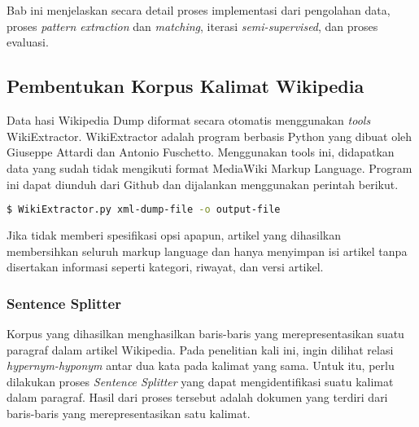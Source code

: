 \chapter{\babEmpat}
Bab ini menjelaskan secara detail proses implementasi dari pengolahan data, proses \textit{pattern extraction} dan \textit{matching}, iterasi \textit{semi-supervised}, dan proses evaluasi.


\section{Pembentukan Korpus Kalimat Wikipedia}
Data hasi Wikipedia Dump diformat secara otomatis menggunakan \textit{tools} WikiExtractor. WikiExtractor adalah program berbasis Python yang dibuat oleh Giuseppe Attardi dan Antonio Fuschetto. Menggunakan tools ini, didapatkan data yang sudah tidak mengikuti format MediaWiki Markup Language. Program ini dapat diunduh dari Github dan dijalankan menggunakan perintah berikut. 
\begin{lstlisting}[language=bash]
  $ WikiExtractor.py xml-dump-file -o output-file
\end{lstlisting}
Jika tidak memberi spesifikasi opsi apapun, artikel yang dihasilkan membersihkan seluruh markup language dan hanya menyimpan isi artikel tanpa disertakan informasi seperti kategori, riwayat, dan versi artikel.

\subsection{Sentence Splitter}
Korpus yang dihasilkan menghasilkan baris-baris yang merepresentasikan suatu paragraf dalam artikel Wikipedia. Pada penelitian kali ini, ingin dilihat relasi \textit{hypernym-hyponym} antar dua kata pada kalimat yang sama. Untuk itu, perlu dilakukan proses \textit{Sentence Splitter} yang dapat mengidentifikasi suatu kalimat dalam paragraf. Hasil dari proses tersebut adalah dokumen yang terdiri dari baris-baris yang merepresentasikan satu kalimat. 


